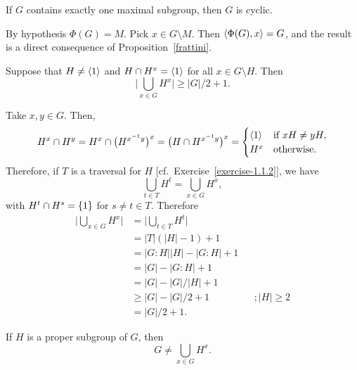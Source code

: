 \begin{exr}\label{exercise-1.2.10}
    If\/ $G$ contains exactly one maximal subgroup, then\/ $G$ is cyclic.
\end{exr}

\begin{solution}
    By hypothesis $\Phi(G)=M$. Pick $x\in G\setminus M$. Then $\langle\Phi(G),x\rangle=G$, and the result is a direct consequence of Proposition~\ref{frattini}.
\end{solution}

\begin{exr}\label{exercise-1.1.11}
    Suppose that\/ $H\neq\langle1\rangle$ and\/ $H\cap H^x=\langle1\rangle$ for all\/ $x\in G\setminus H$. Then
    $$
        \Big|\bigcup_{x\in G}H^x\Big| \ge |G|/2 + 1.
    $$
\end{exr}

\begin{solution} Take $x,y\in G$. Then,
$$
    H^x\cap H^y = H^x\cap\big(H^{x^{-1}y}\big)^x = \big(H\cap H^{x^{-1}y}\big)^x = \begin{cases}
        \langle1\rangle   &\text{if }xH\ne yH,\\
        H^x   &\text{otherwise}.
    \end{cases}
$$
Therefore, if $T$ is a traversal for $H$ [cf.~Exercise~\ref{exercise-1.1.2}], we have
$$
    \bigcup_{t\in T}H^t = \bigcup_{x\in G}H^x,
$$
with $H^t\cap H^s=\{1\}$ for $s\ne t\in T$. Therefore
\begin{align*}
     \Big|\bigcup_{x\in G}H^x\Big| &= \Big|\bigcup_{t\in T}H^t\Big|\\
        &= |T|(|H|-1)+1\\
        &= |G:H||H|-|G:H|+1\\
        &= |G|-|G:H|+1\\
        &= |G| - |G|/|H| + 1\\
        &\ge |G| - |G|/2 + 1    &&; |H|\ge2\\
        &= |G|/2 + 1.
\end{align*}
 \end{solution}

\begin{exr}\label{exercise-1.1.12}
    If\/ $H$ is a proper subgroup of\/ $G$, then
    $$
        G\ne\bigcup_{x\in G}H^x.
    $$
\end{exr}

